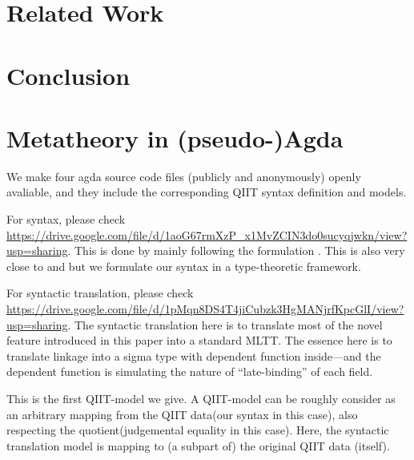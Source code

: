 \section{Related Work}\label{sec:related-work}


\section{Conclusion}
\label{sec:conclusion}



\setlength{\bibsep}{.8ex}



\appendix

\section{Metatheory in (pseudo-)Agda}
We make four agda source code files (publicly and anonymously) openly avaliable, and they include the corresponding QIIT syntax definition and models. 

For syntax, please check \\ \href{https://drive.google.com/file/d/1aoG67rmXzP_x1MvZCIN3do0sucyqjwkn/view?usp=sharing}{https://drive.google.com/file/d/1aoG67rmXzP_x1MvZCIN3do0sucyqjwkn/view?usp=sharing}. This is done by mainly following the formulation \citet{altkap2016}. This is also very close to \citet{coquand2018canonicity} and \citet{sterling2019algebraic} but we formulate our syntax in a type-theoretic framework.

For syntactic translation, please check \\ \href{https://drive.google.com/file/d/1pMqn8DS4T4jiCubzk3HgMANjrfKpcGlI/view?usp=sharing}{https://drive.google.com/file/d/1pMqn8DS4T4jiCubzk3HgMANjrfKpcGlI/view?usp=sharing}. The syntactic translation here is to translate most of the novel feature introduced in this paper into a standard MLTT. 
The essence here is to translate linkage into a sigma type  with dependent function inside---and the dependent function is simulating the nature of ``late-binding'' of each field.


This is the first QIIT-model we give. A QIIT-model can be roughly consider as an arbitrary mapping from the QIIT data(our syntax in this case), also respecting the quotient(judgemental equality in this case). Here, the syntactic translation model is mapping to (a subpart of) the original QIIT data (itself). 

